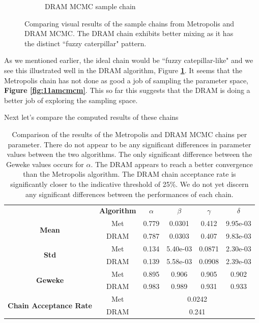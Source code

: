 \documentclass{article}
\begin{document}
\begin{figure}[H]
\begin{subfigure}{.5\textwidth}
  \caption{DRAM MCMC sample chain}
  \label{fig:11bmcmcm} 
\end{subfigure}
\caption{Comparing visual results of the sample chains from Metropolis and DRAM MCMC. The DRAM chain exhibits better mixing as it has the distinct ``fuzzy caterpillar" pattern.}
\label{fig:11mcmc}
\end{figure}
As we mentioned earlier, the ideal chain would be ``fuzzy catepillar-like" and we see this illustrated well in the DRAM algorithm, Figure \textbf{\ref{fig:11bmcmcm}}. It seems that the Metropolis chain has not done as good a job of sampling the parameter space, \textbf{Figure \ref{fig:11amcmcm}}. This so far this suggests that the DRAM is doing a better job of exploring the sampling space.
\par Next let's compare the computed results of these chains
\begin{table}[H]
\centering
        \begin{tabular}{c | c | c c c c}
            \cline{2-6}
            & \textbf{Algorithm} &  \textbf{$\alpha$} & \textbf{ $\beta$} &  \textbf{$\gamma$} & \textbf{$\delta$}\\ 
            \cline{1-6}
            
            \multirow{2}{*}{\textbf{Mean}} & Met & 0.779 & 0.0301 & 0.412 & 9.95e-03 \\
            & DRAM & 0.787 & 0.0303 & 0.407 & 9.83e-03\\ \hline
            \multirow{2}{*}{\textbf{Std}} & Met &  0.134 & 5.40e-03 & 0.0871 & 2.30e-03 \\
            & DRAM & 0.139 & 5.58e-03 & 0.0908 & 2.39e-03\\ \hline
            \multirow{2}{*}{\textbf{Geweke}} & Met & 0.895 & 0.906 & 0.905 & 0.902 \\
            & DRAM & 0.983 & 0.989 & 0.931 & 0.933\\ \hline
            \multirow{2}{*}{\textbf{Chain Acceptance Rate}} & Met & \multicolumn{4}{c}{0.0242}\\
            & DRAM & \multicolumn{4}{c}{0.241}
             \\\hline
             \hline
        \end{tabular}
    \caption{Comparison of the results of the Metropolis and DRAM MCMC chains per parameter. There do not appear to be any significant differences in parameter values between the two algorithms. The only significant difference between the Geweke values occurs for $\alpha$. The DRAM appears to reach a better convergence than the Metropolis algorithm. The DRAM chain acceptance rate is significantly closer to the indicative threshold of 25\%. We do not yet discern any significant differences between the performances of each chain.}
    \label{tab:3mcmc}
\end{table}
\end{document}
